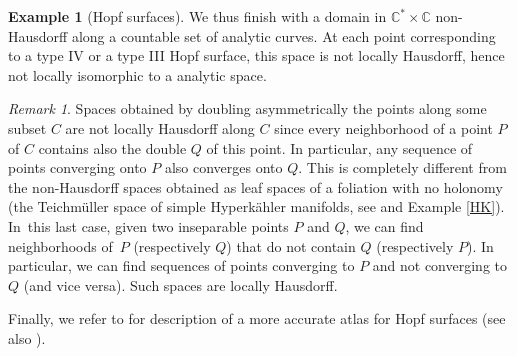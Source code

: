 \documentclass[JEP,XML,SOM,Unicode]{cedram}
\theoremstyle{plain}
\theoremstyle{definition}
\newtheorem{example}[theorem]{Example}
\theoremstyle{remark}
\newtheorem{remark}[theorem]{Remark}
\numberwithin{equation}{section}
\newcommand{\CC}{{\mathbb{C}}}
\begin{document}
\begin{example}[Hopf surfaces]
We thus finish with a domain in $\CC^*\times \CC$ non-Hausdorff along a countable set of analytic curves. At each point corresponding to a type IV or a type III Hopf surface, this space is not locally Hausdorff, hence not locally isomorphic to a analytic space.
\begin{remark}
\label{Hausdorfftypes}
Spaces obtained by doubling asymmetrically the points along some subset $C$ are not locally Hausdorff along $C$ since every neighborhood of a point $P$ of $C$ contains also the double $Q$ of this point. In particular, any sequence of points converging onto $P$ also converges onto $Q$. This is completely different from the non-Hausdorff spaces obtained as leaf spaces of a foliation with no holonomy (\cf the Teichmüller space of simple Hyperkähler manifolds, see \cite{Verbitsky} and Example \ref{HK}). In~this last case, given two inseparable points $P$ and $Q$, we can find neighborhoods of~$P$ (respectively $Q$) that do not contain $Q$ (respectively $P$). In particular, we can find sequences of points converging to $P$ and not converging to $Q$ (and vice versa). Such spaces are locally Hausdorff.
\end{remark}
\end{example}

Finally, we refer to \cite{Clement} for description of a more accurate atlas for Hopf surfaces (see also \cite{Cortona}).
\end{document}
